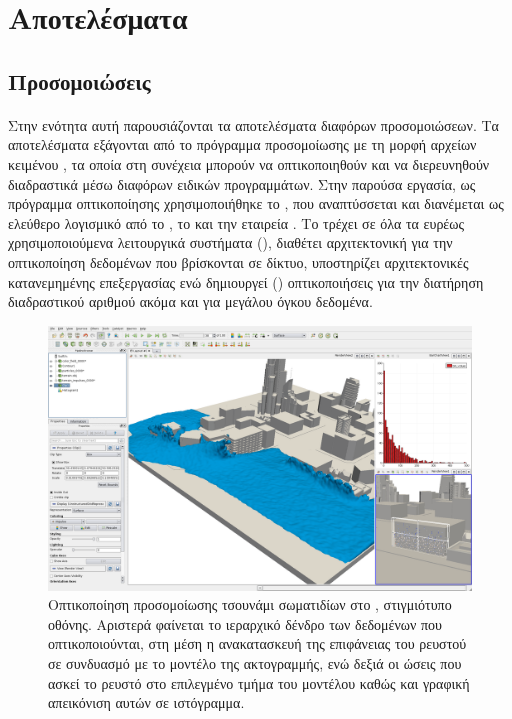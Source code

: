 \section{Αποτελέσματα}

\subsection{Προσομοιώσεις}
\label{ssec:simulations}
\paragraph{} Στην ενότητα αυτή παρουσιάζονται τα αποτελέσματα διαφόρων προσομοιώσεων. Τα
αποτελέσματα εξάγονται από το πρόγραμμα προσομοίωσης με τη μορφή αρχείων κειμένου
, τα οποία στη συνέχεια μπορούν να οπτικοποιηθούν και να διερευνηθούν διαδραστικά
μέσω διαφόρων ειδικών προγραμμάτων. Στην παρούσα εργασία, ως πρόγραμμα οπτικοποίησης
χρησιμοποιήθηκε το , που αναπτύσσεται και διανέμεται ως ελεύθερο λογισμικό
από το , το  και την
εταιρεία . Το  τρέχει σε όλα τα ευρέως χρησιμοποιούμενα
λειτουργικά συστήματα (), διαθέτει αρχιτεκτονική
 για την οπτικοποίηση δεδομένων που βρίσκονται σε δίκτυο, υποστηρίζει
αρχιτεκτονικές κατανεμημένης επεξεργασίας ενώ δημιουργεί  ()
οπτικοποιήσεις για την διατήρηση διαδραστικού αριθμού  ακόμα και για μεγάλου
όγκου δεδομένα.

\begin{figure}
  \centering
  \includegraphics[width=\textwidth]{figures/paraview-interface.png}
  \caption[Οπτικοποίηση προσομοίωσης] {Οπτικοποίηση προσομοίωσης τσουνάμι 
    σωματιδίων στο , στιγμιότυπο οθόνης. Αριστερά φαίνεται το ιεραρχικό
    δένδρο των δεδομένων που οπτικοποιούνται, στη μέση η ανακατασκευή της επιφάνειας του
    ρευστού σε συνδυασμό με το μοντέλο της ακτογραμμής, ενώ δεξιά οι ώσεις που ασκεί το
    ρευστό στο επιλεγμένο τμήμα του μοντέλου καθώς και γραφική απεικόνιση αυτών σε
    ιστόγραμμα.}
  \label{fig:paraview-interface}
\end{figure}

